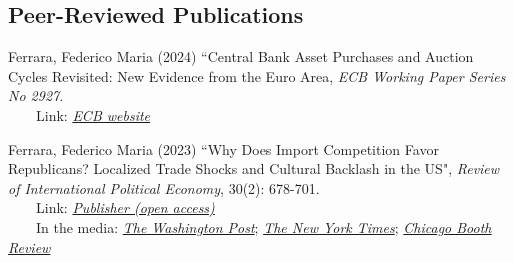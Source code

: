 \documentclass[margin, line]{res}
\newenvironment{list1}{
 \begin{list}{\ding{113}}{%
  \setlength{\itemsep}{0in}
  \setlength{\parsep}{0in} \setlength{\parskip}{0in}
  \setlength{\topsep}{0in} \setlength{\partopsep}{0in} 
  \setlength{\leftmargin}{0.17in}}}{\end{list}}
\begin{document}
\begin{resume}





\section{\sc Peer-Reviewed Publications}

Ferrara, Federico Maria (2024) ``Central Bank Asset Purchases and Auction Cycles Revisited: New Evidence from the Euro Area, \textit{ECB Working Paper Series No 2927}.\\ \-\ \-\ \-\ \-\ Link: \href{https://www.ecb.europa.eu/pub/pdf/scpwps/ecb.wp2927~e373af333e.en.pdf}{\textit{ECB website}}

Ferrara, Federico Maria (2023) ``Why Does Import Competition Favor Republicans? Localized Trade Shocks and Cultural Backlash in the US", \textit{Review of International Political Economy}, 30(2): 678-701.\\ \-\ \-\ \-\ \-\ Link: \href{https://www.tandfonline.com/doi/full/10.1080/09692290.2021.1980898}{\textit{Publisher (open access)}}\\  \-\ \-\ \-\  \-\ In the media: \href{https://www.washingtonpost.com/news/monkey-cage/wp/2016/12/02/trump-won-where-import-shocks-from-china-and-mexico-were-strongest/?postshare=2681480673478579&tid=ss_fb-bottom&utm_term=.7cf92c84564b}{\textit{The Washington Post}}; \href{https://www.nytimes.com/2018/05/03/opinion/trump-industrial-revolutions.html}{\textit{The New York Times}}; \href{http://review.chicagobooth.edu/economics/2018/article/explaining-trump-presidency-using-economics-and-cultural-displacement}{\textit{Chicago Booth Review}}


\end{resume}
\end{document}
